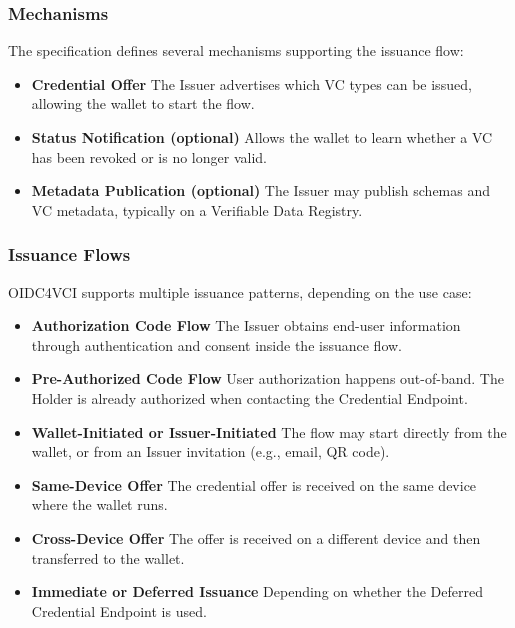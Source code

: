 \subsubsection *{Mechanisms}

The specification defines several mechanisms supporting the issuance flow:

\begin{itemize}
    \item \textbf{Credential Offer}  
    The Issuer advertises which VC types can be issued, allowing the wallet to start the flow.

    \item \textbf{Status Notification (optional)}  
    Allows the wallet to learn whether a VC has been revoked or is no longer valid.

    \item \textbf{Metadata Publication (optional)}  
    The Issuer may publish schemas and VC metadata, typically on a Verifiable Data Registry.
\end{itemize}

\subsubsection *{Issuance Flows}

OIDC4VCI supports multiple issuance patterns, depending on the use case:

\begin{itemize}
    \item \textbf{Authorization Code Flow}  
    The Issuer obtains end-user information through authentication and consent inside the issuance flow.

    \item \textbf{Pre-Authorized Code Flow}  
    User authorization happens out-of-band.  
    The Holder is already authorized when contacting the Credential Endpoint.

    \item \textbf{Wallet-Initiated or Issuer-Initiated}  
    The flow may start directly from the wallet, or from an Issuer invitation (e.g., email, QR code).

    \item \textbf{Same-Device Offer}  
    The credential offer is received on the same device where the wallet runs.

    \item \textbf{Cross-Device Offer}  
    The offer is received on a different device and then transferred to the wallet.

    \item \textbf{Immediate or Deferred Issuance}  
    Depending on whether the Deferred Credential Endpoint is used.
\end{itemize}

